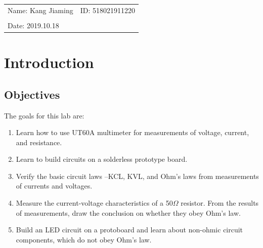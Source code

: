 \documentclass{article}
\begin{document}
\vspace*{0.25cm}

\hrulefill

\thispagestyle{empty}

\begin{center}
\begin{large}
\end{large}

\hrulefill

\vspace*{5cm}
\begin{Large}
\end{Large}

\vspace{2em}

\begin{large}
\end{large}
\end{center}
\vfill

\begin{table}[h!]
\centering
\begin{tabular}{ll}
Name: Kang Jiaming \hspace*{2em}&
ID: 518021911220\hspace*{2em}\\

\\

Date:  2019.10.18

\end{tabular}
\end{table}

\hfill
\newpage


		\section{Introduction\label{intro}}
	\subsection{Objectives}
\noindent The goals for this lab are:
\begin{enumerate}
\item Learn how to use UT60A multimeter for measurements of voltage, current, and resistance. 
\item Learn to build circuits on a solderless prototype board. 
\item Verify the basic circuit laws –KCL, KVL, and Ohm’s laws from measurements of currents and voltages.
\item Measure the current-voltage characteristics of a 50$\Omega$ resistor. From the results of measurements, draw the conclusion on whether they obey Ohm’s law. 
\item Build an LED circuit on a protoboard and learn about non-ohmic circuit components, which do not obey Ohm’s law.  
\end{enumerate}
\end{document}
